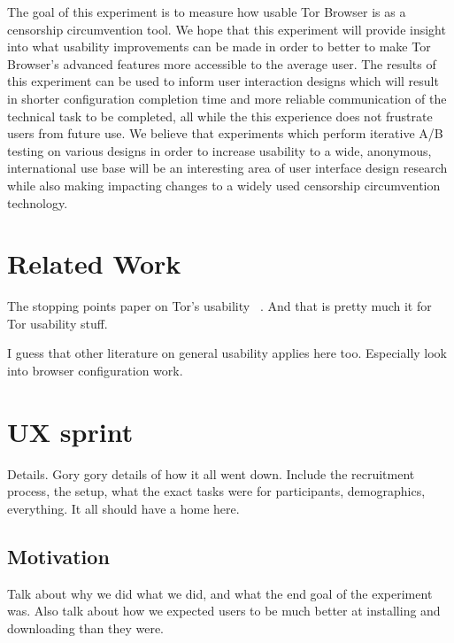 \documentclass[letterpaper,twocolumn,11pt]{article}
\begin{document}
The goal of this experiment is to measure how usable Tor Browser is as a censorship circumvention
tool. We hope that this experiment will provide insight into what usability improvements can be made 
in order to better to make Tor Browser's advanced features more accessible to the average user. The results
of this experiment can be used to inform user interaction designs which will result in shorter configuration
completion time and more reliable communication of the technical task to be completed, all while the 
this experience does not frustrate users from future use. We believe that experiments which perform
iterative A/B testing on various designs in order to increase usability to a wide, anonymous, international 
use base will be an interesting area of user interface design research while also making impacting changes
to a widely used censorship circumvention technology. 

\section{Related Work} %
 {\color {red} The stopping points paper on Tor's usability ~\cite{norcie2012eliminating}. 
And that is pretty much it for Tor usability stuff.} %

{\color {red}  I guess that other literature on general usability applies here too. %
Especially look into browser configuration work. }

\indent {}

\indent {}

\appendix

\section{UX sprint} 
\label{sec:pilot}
 {\color {red}Details. Gory gory details of how it all went down. 
Include the recruitment process, the setup, what the exact 
tasks were for participants, demographics, everything. 
It all should have a home here.}

\subsection{Motivation}
{\color {red} Talk about why we did what we did, and what the end goal 
of the experiment was. Also talk about how we expected users
to be much better at installing and downloading than they were. }
\end{document}
